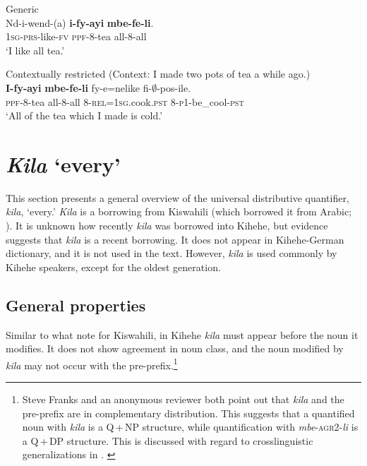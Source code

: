\documentclass[output=paper,modfonts,nonflat]{langsci/langscibook}
\begin{document}
\begin{exe}

\ex \begin{xlist} \label{ex:kaspercushman:drinktea}
\ex Generic\\
\gll Nd-i-wend-(a) \textbf{i-fy-ayi} \textbf{mbe-fe-li}. \\
\textsc{1sg}-\textsc{prs}-like-\textsc{fv} \textsc{ppf}-8-tea all-8-all \\
\glt `I like all tea.'

\ex Contextually restricted (Context: I made two pots of tea a while ago.)\\
\gll \textbf{I-fy-ayi} \textbf{mbe-fe-li} fy-e=nelike fi-$\emptyset$-pos-ile. \\
\textsc{ppf}-8-tea all-8-all 8-\textsc{rel}=\textsc{1sg}.cook.\textsc{pst} 8-\textsc{p1}-be\_cool-\textsc{pst} \\
\glt `All of the tea which I made is cold.' 

\end{xlist}
\end{exe}



\section{\emph{Kila} `every'} \label{sec:kaspercushman:every}\label{sec:kasper:3}
This section presents a general overview of the universal distributive quantifier, \textit{kila}, `every.' \textit{Kila} is a borrowing from Kiswahili (which borrowed it from Arabic; \citealt{zerbian08}). It is unknown how recently \textit{kila} was borrowed into Kihehe, but evidence suggests that \textit{kila} is a recent borrowing. It does not appear in  Kihehe-German dictionary, and it is not used in the \citeauthor{Luwuko2011} text. However, \textit{kila} is used commonly by Kihehe speakers, except for the oldest generation.

\subsection{General properties}

Similar to what \cite{zerbian08} note for Kiswahili, in Kihehe \textit{kila} must appear before the noun it modifies. It does not show agreement in noun class, and the noun modified by \textit{kila} may not occur with the pre-prefix.\footnote{Steve
    Franks and an anonymous reviewer both point out that \textit{kila} and the pre-prefix are in complementary distribution.  This suggests that a quantified noun with \textit{kila} is a Q\,+\,NP structure, while quantification with \textit{mbe}-\textsc{agr2}-\textit{li} is a Q\,+\,DP structure. This is discussed with regard to crosslinguistic generalizations in . \label{foot:kaspercushman:1}
}
\end{document}
